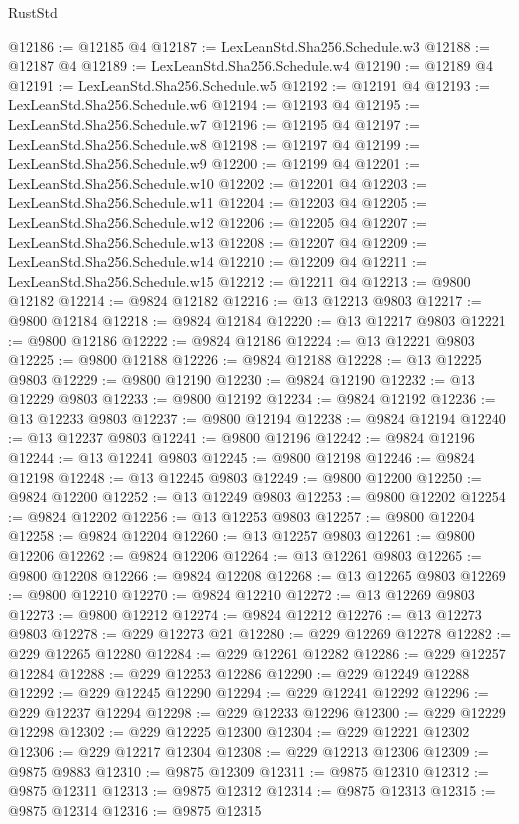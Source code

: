 \begin{lexlean}{RustStd}
\begin{coremodule}
@12186 := @12185 @4
@12187 := LexLeanStd.Sha256.Schedule.w3
@12188 := @12187 @4
@12189 := LexLeanStd.Sha256.Schedule.w4
@12190 := @12189 @4
@12191 := LexLeanStd.Sha256.Schedule.w5
@12192 := @12191 @4
@12193 := LexLeanStd.Sha256.Schedule.w6
@12194 := @12193 @4
@12195 := LexLeanStd.Sha256.Schedule.w7
@12196 := @12195 @4
@12197 := LexLeanStd.Sha256.Schedule.w8
@12198 := @12197 @4
@12199 := LexLeanStd.Sha256.Schedule.w9
@12200 := @12199 @4
@12201 := LexLeanStd.Sha256.Schedule.w10
@12202 := @12201 @4
@12203 := LexLeanStd.Sha256.Schedule.w11
@12204 := @12203 @4
@12205 := LexLeanStd.Sha256.Schedule.w12
@12206 := @12205 @4
@12207 := LexLeanStd.Sha256.Schedule.w13
@12208 := @12207 @4
@12209 := LexLeanStd.Sha256.Schedule.w14
@12210 := @12209 @4
@12211 := LexLeanStd.Sha256.Schedule.w15
@12212 := @12211 @4
@12213 := @9800 @12182
@12214 := @9824 @12182
@12216 := @13 @12213 @9803
@12217 := @9800 @12184
@12218 := @9824 @12184
@12220 := @13 @12217 @9803
@12221 := @9800 @12186
@12222 := @9824 @12186
@12224 := @13 @12221 @9803
@12225 := @9800 @12188
@12226 := @9824 @12188
@12228 := @13 @12225 @9803
@12229 := @9800 @12190
@12230 := @9824 @12190
@12232 := @13 @12229 @9803
@12233 := @9800 @12192
@12234 := @9824 @12192
@12236 := @13 @12233 @9803
@12237 := @9800 @12194
@12238 := @9824 @12194
@12240 := @13 @12237 @9803
@12241 := @9800 @12196
@12242 := @9824 @12196
@12244 := @13 @12241 @9803
@12245 := @9800 @12198
@12246 := @9824 @12198
@12248 := @13 @12245 @9803
@12249 := @9800 @12200
@12250 := @9824 @12200
@12252 := @13 @12249 @9803
@12253 := @9800 @12202
@12254 := @9824 @12202
@12256 := @13 @12253 @9803
@12257 := @9800 @12204
@12258 := @9824 @12204
@12260 := @13 @12257 @9803
@12261 := @9800 @12206
@12262 := @9824 @12206
@12264 := @13 @12261 @9803
@12265 := @9800 @12208
@12266 := @9824 @12208
@12268 := @13 @12265 @9803
@12269 := @9800 @12210
@12270 := @9824 @12210
@12272 := @13 @12269 @9803
@12273 := @9800 @12212
@12274 := @9824 @12212
@12276 := @13 @12273 @9803
@12278 := @229 @12273 @21
@12280 := @229 @12269 @12278
@12282 := @229 @12265 @12280
@12284 := @229 @12261 @12282
@12286 := @229 @12257 @12284
@12288 := @229 @12253 @12286
@12290 := @229 @12249 @12288
@12292 := @229 @12245 @12290
@12294 := @229 @12241 @12292
@12296 := @229 @12237 @12294
@12298 := @229 @12233 @12296
@12300 := @229 @12229 @12298
@12302 := @229 @12225 @12300
@12304 := @229 @12221 @12302
@12306 := @229 @12217 @12304
@12308 := @229 @12213 @12306
@12309 := @9875 @9883
@12310 := @9875 @12309
@12311 := @9875 @12310
@12312 := @9875 @12311
@12313 := @9875 @12312
@12314 := @9875 @12313
@12315 := @9875 @12314
@12316 := @9875 @12315

\end{coremodule}
\end{lexlean}
